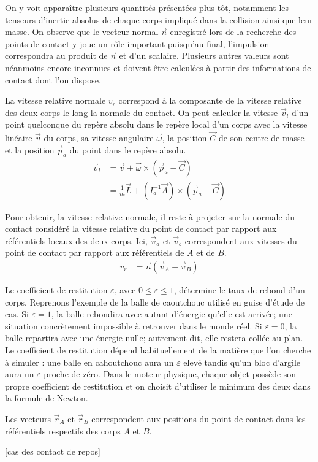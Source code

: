 On y voit apparaître plusieurs quantités présentées plus tôt,
notamment les tenseurs d'inertie absolus de chaque corps impliqué dans
la collision ainsi que leur masse. On observe que le vecteur normal
$\vec{n}$ enregistré lors de la recherche des points de contact y joue
un rôle important puisqu'au final, l'impulsion correspondra au produit
de $\vec{n}$ et d'un scalaire. Plusieurs autres valeurs sont néanmoins
encore inconnues et doivent être calculées à partir des informations
de contact dont l'on dispose.

La vitesse relative normale $v_r$ correspond à la composante de la
vitesse relative des deux corps le long la normale du contact. On peut
calculer la vitesse $\vec{v}_l$ d'un point quelconque du repère absolu
dans le repère local d'un corps avec la vitesse linéaire $\vec{v}$ du
corps, sa vitesse angulaire $\vec{\omega}$, la position $\vec{C}$ de
son centre de masse et la position $\vec{p}_a$ du point dans le repère
absolu.
\begin{align*}
  \vec{v}_l &= \vec{v} + \vec{\omega} \times (\vec{p}_a - \vec{C}) \\
            &= \frac{1}{m} \vec{L} + (I^{-1}_a \vec{A}) \times (\vec{p}_a - \vec{C})
\end{align*}

Pour obtenir, la vitesse relative normale, il reste à projeter sur la
normale du contact considéré la vitesse relative du point de contact
par rapport aux référentiels locaux des deux corps. Ici, $\vec{v}_a$
et $\vec{v}_b$ correspondent aux vitesses du point de contact par
rapport aux référentiels de $A$ et de $B$.
\begin{align*}
  v_r &= \vec{n} (\vec{v}_{A} - \vec{v}_{B})
\end{align*}

Le coefficient de restitution $\varepsilon$, avec $0 \leq \varepsilon
\leq 1$, détermine le taux de rebond d'un corps. Reprenons l'exemple
de la balle de caoutchouc utilisé en guise d'étude de cas. Si
$\varepsilon = 1$, la balle rebondira avec autant d'énergie qu'elle
est arrivée; une situation concrètement impossible à retrouver dans le
monde réel. Si $\varepsilon = 0$, la balle repartira avec une énergie
nulle; autrement dit, elle restera collée au plan. Le coefficient de
restitution dépend habituellement de la matière que l'on cherche à
simuler : une balle en cahoutchouc aura un $\varepsilon$ elevé tandis
qu'un bloc d'argile aura un $\varepsilon$ proche de zéro. Dans le
moteur physique, chaque objet possède son propre coefficient de
restitution et on choisit d'utiliser le minimum des deux dans la
formule de Newton.

Les vecteurs $\vec{r}_A$ et $\vec{r}_B$ correspondent aux positions du
point de contact dans les référentiels respectifs des corps $A$ et $B$.

[cas des contact de repos]

